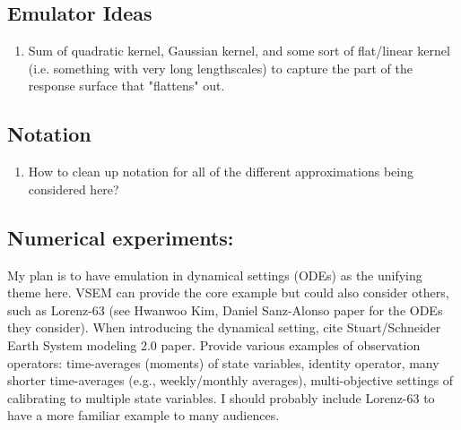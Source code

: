 \documentclass[12pt]{article}
\begin{document}
\subsection{Emulator Ideas}
\begin{enumerate}
\item Sum of quadratic kernel, Gaussian kernel, and some sort of flat/linear kernel (i.e. something with very long lengthscales) to capture the 
part of the response surface that "flattens" out. 
\end{enumerate}

\subsection{Notation}
\begin{enumerate}
\item How to clean up notation for all of the different approximations being considered here? 
\end{enumerate}

\subsection{Numerical experiments:}
My plan is to have emulation in dynamical settings (ODEs) as the unifying theme here. VSEM can provide the core example but could also consider 
others, such as Lorenz-63 (see Hwanwoo Kim, Daniel Sanz-Alonso paper for the ODEs they consider). When introducing the dynamical setting,
cite Stuart/Schneider Earth System modeling 2.0 paper. Provide various examples of observation operators: time-averages (moments) of state 
variables, identity operator, many shorter time-averages (e.g., weekly/monthly averages), multi-objective settings of calibrating to multiple state 
variables. I should probably include Lorenz-63 to have a more familiar example to many audiences. 
\end{document}
